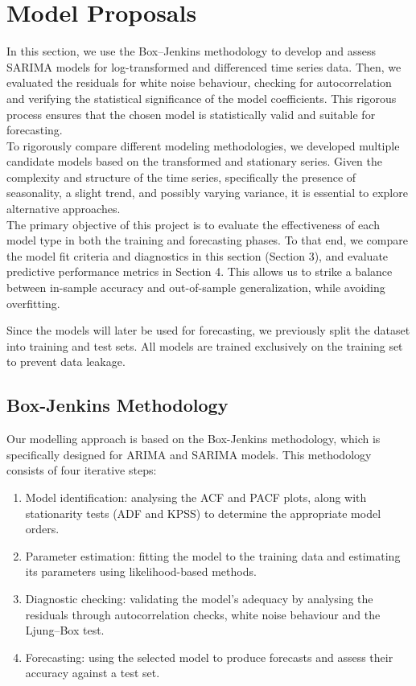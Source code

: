 \section{Model Proposals}

In this section, we use the Box–Jenkins methodology to develop and assess SARIMA models for log-transformed and differenced time series data.
Then, we evaluated the residuals for white noise behaviour, checking for autocorrelation and verifying the statistical significance of the model coefficients.
This rigorous process ensures that the chosen model is statistically valid and suitable for forecasting.\\

To rigorously compare different modeling methodologies, we developed multiple candidate models based on the transformed and stationary series. Given the complexity and structure of the time series, specifically the presence of seasonality, a slight trend, and possibly varying variance, it is essential to explore alternative approaches.\\

The primary objective of this project is to evaluate the effectiveness of each model type in both the training and forecasting phases. To that end, we compare the model fit criteria and diagnostics in this section (Section 3), and evaluate predictive performance metrics in Section 4. This allows us to strike a balance between in-sample accuracy and out-of-sample generalization, while avoiding overfitting.

Since the models will later be used for forecasting, we previously split the dataset into training and test sets. All models are trained exclusively on the training set to prevent data leakage. 

\subsection{Box-Jenkins Methodology}
Our modelling approach is based on the Box-Jenkins methodology, which is specifically designed for ARIMA and SARIMA models. This methodology consists of four iterative steps:

\begin{enumerate}
    \item Model identification: analysing the ACF and PACF plots, along with stationarity tests (ADF and KPSS) to determine the appropriate model orders.
    \item Parameter estimation: fitting the model to the training data and estimating its parameters using likelihood-based methods.
    
    \item Diagnostic checking: validating the model's adequacy by analysing the residuals through autocorrelation checks, white noise behaviour and the Ljung–Box test.

    \item Forecasting: using the selected model to produce forecasts and assess their accuracy against a test set.
\end{enumerate}

